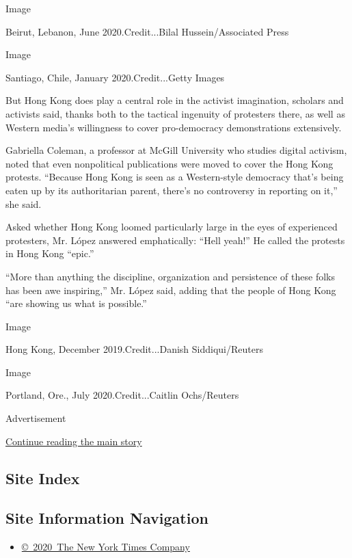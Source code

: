 Image

Beirut, Lebanon, June 2020.Credit...Bilal Hussein/Associated Press

Image

Santiago, Chile, January 2020.Credit...Getty Images

But Hong Kong does play a central role in the activist imagination,
scholars and activists said, thanks both to the tactical ingenuity of
protesters there, as well as Western media's willingness to cover
pro-democracy demonstrations extensively.

Gabriella Coleman, a professor at McGill University who studies digital
activism, noted that even nonpolitical publications were moved to cover
the Hong Kong protests. ``Because Hong Kong is seen as a Western-style
democracy that's being eaten up by its authoritarian parent, there's no
controversy in reporting on it,'' she said.

Asked whether Hong Kong loomed particularly large in the eyes of
experienced protesters, Mr. López answered emphatically: ``Hell yeah!''
He called the protests in Hong Kong ``epic.''

``More than anything the discipline, organization and persistence of
these folks has been awe inspiring,'' Mr. López said, adding that the
people of Hong Kong ``are showing us what is possible.''

Image

Hong Kong, December 2019.Credit...Danish Siddiqui/Reuters

Image

Portland, Ore., July 2020.Credit...Caitlin Ochs/Reuters

Advertisement

\protect\hyperlink{after-bottom}{Continue reading the main story}

\hypertarget{site-index}{%
\subsection{Site Index}\label{site-index}}

\hypertarget{site-information-navigation}{%
\subsection{Site Information
Navigation}\label{site-information-navigation}}

\begin{itemize}
\tightlist
\item
  \href{https://help.nytimes.com/hc/en-us/articles/115014792127-Copyright-notice}{©~2020~The
  New York Times Company}
\end{itemize}

